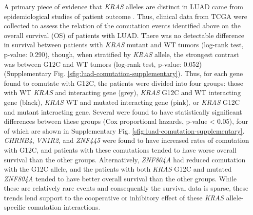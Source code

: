 \documentclass[english, 10pt, letterpaper]{article}
\newcommand{\KRAS}{\emph{KRAS}}
\begin{document}
A primary piece of evidence that \KRAS{} alleles are distinct in LUAD came from epidemiological studies of patient outcome \cite{Cserepes2014Subtype-specificChemotherapy., Marabese2015KRASChemotherapy.}.
Thus, clinical data from TCGA \cite{CancerGenomeAtlasResearchNetwork2014} were collected to assess the relation of the comutation events identified above on the overall survival (OS) of patients with LUAD.
There was no detectable difference in survival between patients with \KRAS{} mutant and WT tumors (log-rank test, p-value: 0.290), though, when stratified by \KRAS{} allele, the strongest contrast was between G12C and WT tumors (log-rank test, p-value: 0.052) (Supplementary Fig. \ref{sfig:luad-comutation-supplementary}).
Thus, for each gene found to comutate with G12C, the patients were divided into four groups: those with WT \KRAS{} and interacting gene (grey), \KRAS{} G12C and WT interacting gene (black), \KRAS{} WT and mutated interacting gene (pink), or \KRAS{} G12C and mutant interacting gene.
Several were found to have statistically significant differences between these groups (Cox proportional hazards, p-value < 0.05), four of which are shown in Supplementary Fig. \ref{sfig:luad-comutation-supplementary}.
\emph{CHRNB4}, \emph{VN1R2}, and \emph{ZNF445} were found to have increased rates of comutation with G12C, and patients with these comutations tended to have worse overall survival than the other groups.
Alternatively, \emph{ZNF804A} had reduced comutation with the G12C allele, and the patients with both \KRAS{} G12C and mutated \emph{ZNF804A} tended to have better overall survival than the other groups.
While these are relatively rare events and consequently the survival data is sparse, these trends lend support to the cooperative or inhibitory effect of these \KRAS{} allele-specific comutation interactions.
\end{document}
